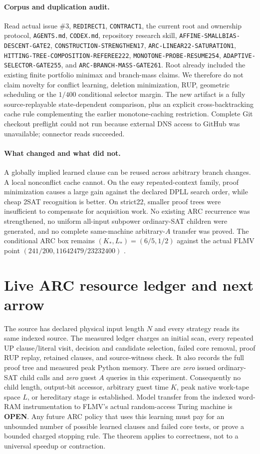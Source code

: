 \documentclass[10pt]{article}
\newcommand{\OPEN}{\textbf{OPEN}}
\begin{document}
\paragraph{Corpus and duplication audit.} Read actual issue \#3,
\texttt{REDIRECT1}, \texttt{CONTRACT1}, the current root and ownership
protocol, \texttt{AGENTS.md}, \texttt{CODEX.md}, repository research skill,
\texttt{AFFINE-SMALLBIAS-DESCENT-GATE2}, \texttt{CONSTRUCTION-STRENGTHEN17},
\texttt{ARC-LINEAR22-SATURATION1}, \texttt{HITTING-TREE-COMPOSITION-REFEREE222},
\texttt{MONOTONE-PROBE-RESUME254}, \texttt{ADAPTIVE-SELECTOR-GATE255},
and \texttt{ARC-BRANCH-MASS-GATE261}. Root already included the existing
finite portfolio minimax and branch-mass claims. We therefore do not claim
novelty for conflict learning, deletion minimization, RUP, geometric
scheduling or the $1/400$ conditional selector margin. The new artifact is a
fully source-replayable state-dependent comparison, plus an explicit
cross-backtracking cache rule complementing the earlier monotone-caching
restriction. Complete Git checkout preflight could not run because external
DNS access to GitHub was unavailable; connector reads succeeded.

\paragraph{What changed and what did not.} A globally implied learned clause
can be reused across arbitrary branch changes. A local nonconflict cache
cannot. On the easy repeated-context family, proof minimization causes a
large gain against the declared DPLL search order, while cheap 2SAT recognition
is better. On strict22, smaller proof trees were insufficient to compensate
for acquisition work. No existing ARC recurrence was strengthened, no
uniform all-input subpower ordinary-SAT children were generated, and no
complete same-machine arbitrary-$A$ transfer was proved. The conditional
ARC box remains $(K_*,L_*)=(6/5,1/2)$ against the actual FLMV point
$(241/200,11642479/23232400)$ \cite{flmv2005}.

\section{Live ARC resource ledger and next arrow}
The source has declared physical input length $N$ and every strategy reads its
same indexed source. The measured ledger charges an initial scan, every
repeated UP clause/literal visit, decision and candidate selection, failed
core removal, proof RUP replay, retained clauses, and source-witness check.
It also records the full proof tree and measured peak Python memory.
There are \emph{zero} issued ordinary-SAT child calls and \emph{zero} guest
$A$ queries in this experiment. Consequently no child length, output-bit
accessor, arbitrary guest time $K$, peak native work-tape space $L$, or
hereditary stage is established. Model transfer from the indexed word-RAM
instrumentation to FLMV's actual random-access Turing machine is \OPEN.
Any future ARC policy that uses this learning must pay for an unbounded
number of possible learned clauses and failed core tests, or prove a
bounded charged stopping rule. The theorem applies to correctness, not to
a universal speedup or contraction.
\end{document}
